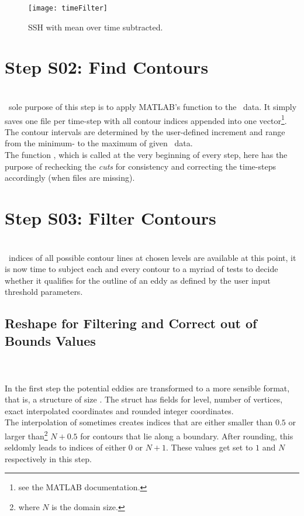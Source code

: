 \begin{figure*}
	\texttt{[image: timeFilter]}
	\caption{SSH with mean over time subtracted.}
	\label{fig:timeFilter}
\end{figure*}
 \section[Finding the Contours]{Step S02: Find Contours} \label{S:03}
\\
~sole purpose of this step is to apply MATLAB's  function
to the \SSH~data. It simply saves one file per time-step with all contour indices
appended into one vector\footnote{see the MATLAB documentation.}. The contour
intervals are determined by the user-defined increment and range from the
minimum- to the maximum of given \SSH~data. \\
The function , which is called at the very beginning of
every step, here has the purpose of rechecking the \textit{cuts} for
consistency and correcting the time-steps accordingly (\ie when files are
missing).
\section[Filtering the Contours]{Step S03: Filter Contours} \label{S:04}
\\
~indices of all possible contour lines at chosen levels are available at
this point, it is now time to subject each and every contour to a
myriad of tests to decide whether it qualifies for the outline of an eddy as
defined by the user input threshold parameters.
\subsection{Reshape for Filtering and Correct out of Bounds Values}
\\
\noindent{}\\
In the first step the potential eddies are transformed to a more sensible
format, that is, a structure  of size . The struct has fields for level, number of
vertices, exact \ie interpolated coordinates and rounded integer coordinates.\\
The interpolation of  sometimes creates indices that are
either smaller than $0.5$ or larger than\footnote{where $N$ is the
domain size.} $N+0.5$ for contours that lie along a boundary. After rounding, this
seldomly leads to indices of either $0$ or $N+1$. These values get set to $1$
and $N$ respectively in this step.
